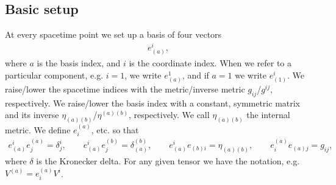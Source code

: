 \documentclass[12pt]{report}
\begin{document}
\subsection{Basic setup}
	 At every spacetime point we set up a basis of four vectors
\begin{align}
	e^i_{(a)}
	,
\end{align}
	where $a$ is the basis index, and $i$ is the coordinate index.
When we refer to a particular component, e.g. $i=1$, we write 
$e^1_{(a)}$, and if $a=1$ we write $e^i_{(1)}$.
We raise/lower the spacetime indices with the metric/inverse
metric
$g_{ij}$/$g^{ij}$, respectively. 
We raise/lower the basis index with a constant, symmetric
matrix and its inverse $\eta_{(a)(b)}$/$\eta^{(a)(b)}$, respectively.
We call $\eta_{(a)(b)}$ the internal metric. We define $e^{(a)}_i$, etc.
so that 
\begin{align}
	e^i_{(a)} e^{(a)}_j = \delta^i_j
	,
	\qquad
	e^i_{(a)} e^{(b)}_j = \delta^{(b)}_{(a)}
	,
	\qquad
	e^i_{(a)} e_{(b)i} = \eta_{(a)(b)}
	,
	\qquad
	e^{(a)}_ie_{(a)j} = g_{ij}
	,
\end{align}
	where $\delta$ is the Kronecker delta. For any given tensor
we have the notation, e.g. $V^{(a)}=e^{(a)}_iV^i$. 
\end{document}
